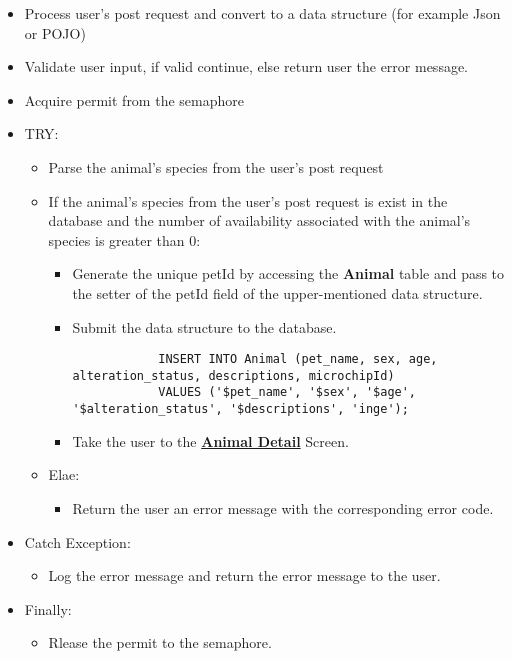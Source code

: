 \documentclass[a4paper]{article}
\begin{document}
\begin{itemize}
	\item Process user's post request and convert to a data structure (for example Json or POJO)
	\item Validate user input, if valid continue, else return user the error message.
	\item Acquire permit from the semaphore
	\item TRY:
	\begin{itemize}

	\item Parse the animal's species from the user's post request
	\item If the animal's species from the user's post request is exist in the database and the number of availability associated with the animal's species is greater than 0:
		\begin{itemize}
			\item Generate the unique petId by accessing the \textbf{Animal} table and pass to the setter of the petId field of the upper-mentioned data structure.
			\item Submit the data structure to the database.
			\begin{lstlisting}
            INSERT INTO Animal (pet_name, sex, age, alteration_status, descriptions, microchipId)
            VALUES ('$pet_name', '$sex', '$age', '$alteration_status', '$descriptions', 'inge');
            \end{lstlisting}
			\item Take the user to the \underline{\textbf{Animal Detail}} Screen.
		\end{itemize}
	\item Elae:
		\begin{itemize}
			\item Return the user an error message with the corresponding error code.
		\end{itemize}

	\end{itemize}
	\item Catch Exception:
		\begin{itemize}
		\item Log the error message and return the error message to the user.
		\end{itemize}
	\item Finally:
		\begin{itemize}
		\item Rlease the permit to the semaphore.
		\end{itemize}
\end{itemize}
\end{document}
